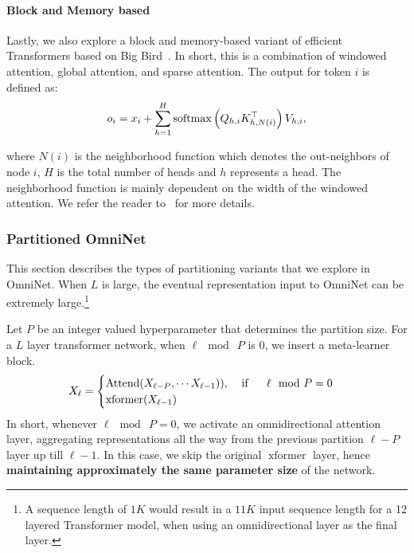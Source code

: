 \documentclass{article}
\DeclareMathOperator{\softmax}{softmax}
\DeclareMathOperator{\att}{Attend}
\DeclareMathOperator{\transformer}{xformer}
\begin{document}
\paragraph{Block and Memory based}
Lastly, we also explore a block and memory-based variant of efficient Transformers based on Big Bird~\citep{zaheer2020big}. In short, this is a combination of windowed attention, global attention, and sparse attention. The output for token $i$ is defined as:
\begin{align*}
\vspace{-5pt}
o_{i} = x_{i} + \sum^H_{h=1} \softmax \left( Q_{h,i}K_{h,N(i)}^\top \right) V_{h,i},   
\vspace{-5pt}
\end{align*}

where $N(i)$ is the neighborhood function which denotes the out-neighbors of node $i$, $H$ is the total number of heads and $h$ represents a head. The neighborhood function is mainly dependent on the width of the windowed attention. We refer the reader to~\citep{zaheer2020big} for more details.

\subsubsection{Partitioned OmniNet}
This section describes the types of partitioning variants that we explore in OmniNet. When $L$ is large, the eventual representation input to OmniNet can be extremely large.\footnote{A sequence length of $1K$ would result in a $11K$ input sequence length for a 12 layered Transformer model, when using an omnidirectional layer as the final layer.}

Let $P$ be an integer valued hyperparameter that determines the partition size. For a $L$ layer transformer network, when $\ell \mod ~P$ is $0$, we insert a meta-learner block. 
\[
\vspace{-5pt}
X_{\ell} = 
\begin{cases}
\att(X_{\ell - P}, \cdots X_{\ell-1})), \:\:\:\:\: \text{if } \:\:\:\:\:\: \ell \mod P = 0 \\ 
\transformer(X_{\ell - 1})
\end{cases}
\]
In short, whenever $\ell \mod ~P=0$, we activate an omnidirectional attention layer, aggregating representations all the way from the previous partition $\ell - P$ layer up till $\ell - 1$. In this case, we skip the original $\transformer$ layer, hence \textbf{maintaining approximately the same parameter size} of the network.
\end{document}
